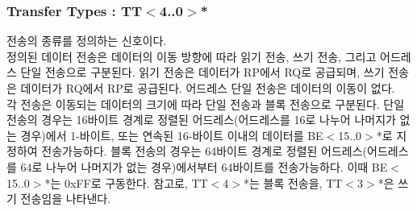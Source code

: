 \subsubsection{Transfer Types : TT$<$4..0$>$*}
전송의 종류를 정의하는 신호이다. \\
정의된 데이터 전송은 데이터의 이동 방향에 따라
읽기 전송, 쓰기 전송, 그리고 어드레스 단일 전송으로 구분된다.
읽기 전송은 데이터가 RP에서 RQ로 공급되며, 쓰기 전송은 데이터가 RQ에서 RP로 
공급된다.
어드레스 단일 전송은 데이터의 이동이 없다. \\
각 전송은 이동되는 데이터의 크기에 따라 단일 전송과 블록 전송으로 구분된다.
단일 전송의 경우는 16바이트 경계로 정렬된 어드레스(어드레스를 16로 나누어 나머지가 없는 경우)에서
1-바이트, 또는 연속된 16-바이트 이내의 데이터를 BE$<$15..0$>$*로
지정하여 전송가능하다.
블록 전송의 경우는 64바이트 경계로 정렬된 어드레스(어드레스를 64로 나누어 나머지가 없는 
경우)에서부터 64바이트를 전송가능하다. 이때 BE$<$15..0$>$*는 0xFF로 구동한다.
참고로, 
TT$<$4$>$*는 블록 전송을, TT$<$3$>$*은 쓰기 전송임을 나타낸다.

